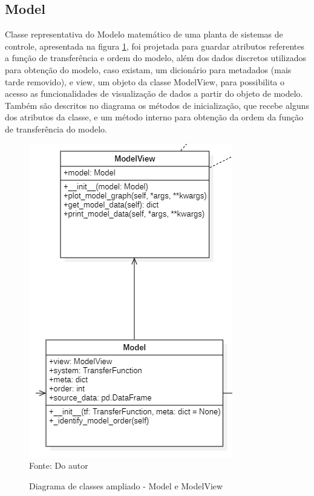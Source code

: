 \subsection{Model}

Classe representativa do Modelo matemático de uma planta de sistemas de controle, apresentada na figura
\ref{fig:class_diag_model}, foi projetada para guardar atributos
referentes a função de transferência e ordem do modelo, além dos dados discretos utilizados para obtenção do modelo,
caso existam, um dicionário para metadados (mais tarde removido), e view, um objeto da classe ModelView, para
possibilita o acesso as funcionalidades de visualização de dados a partir do objeto de modelo.
Também são descritos no diagrama os métodos de inicialização, que recebe alguns dos atributos da classe, e um método
interno para obtenção da ordem da função de transferência do modelo.

\begin{figure}[H]
    \centering
    \caption{Diagrama de classes ampliado - Model e ModelView}
    \includegraphics[scale=0.7]{figuras/class_diag_model}
    \label{fig:class_diag_model}
    \\
    \vspace{0cm}\hspace{0cm}\small{Fonte: Do autor}
\end{figure}

